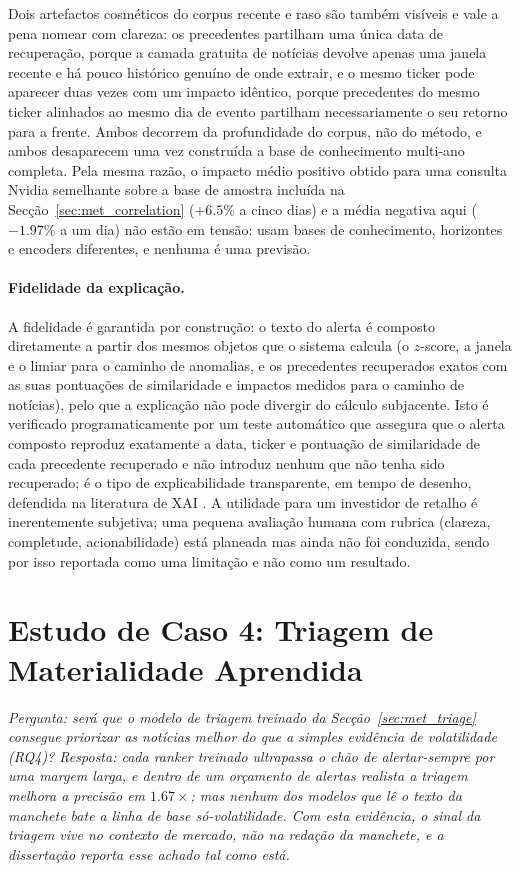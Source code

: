 Dois artefactos cosméticos do corpus recente e raso são também visíveis e vale a pena nomear com clareza: os
precedentes partilham uma única data de recuperação, porque a camada gratuita de notícias devolve apenas uma
janela recente e há pouco histórico genuíno de onde extrair, e o mesmo ticker pode aparecer duas vezes com um
impacto idêntico, porque precedentes do mesmo ticker alinhados ao mesmo dia de evento partilham necessariamente
o seu retorno para a frente. Ambos decorrem da profundidade do corpus, não do método, e ambos desaparecem uma
vez construída a base de conhecimento multi-ano completa. Pela mesma razão, o impacto médio positivo obtido
para uma consulta Nvidia semelhante sobre a base de amostra incluída na Secção~\ref{sec:met_correlation}
($+6.5\%$ a cinco dias) e a média negativa aqui ($-1.97\%$ a um dia) não estão em tensão: usam bases de
conhecimento, horizontes e encoders diferentes, e nenhuma é uma previsão.

\paragraph{Fidelidade da explicação.}
A fidelidade é garantida por construção: o texto do alerta é composto diretamente a partir dos mesmos objetos
que o sistema calcula (o $z$-score, a janela e o limiar para o caminho de anomalias, e os precedentes
recuperados exatos com as suas pontuações de similaridade e impactos medidos para o caminho de notícias), pelo
que a explicação não pode divergir do cálculo subjacente. Isto é verificado programaticamente por um teste
automático que assegura que o alerta composto reproduz exatamente a data, ticker e pontuação de similaridade de
cada precedente recuperado e não introduz nenhum que não tenha sido recuperado; é o tipo de explicabilidade
transparente, em tempo de desenho, defendida na literatura de XAI \autocite{arrieta2020xai}. A utilidade para
um investidor de retalho é inerentemente subjetiva; uma pequena avaliação humana com rubrica (clareza,
completude, acionabilidade) está planeada mas ainda não foi conduzida, sendo por isso reportada como uma
limitação e não como um resultado.

\section{Estudo de Caso 4: Triagem de Materialidade Aprendida}
\label{sec:cs_triage}

\emph{Pergunta: será que o modelo de triagem treinado da Secção~\ref{sec:met_triage} consegue priorizar as
notícias melhor do que a simples evidência de volatilidade (\gls{RQ}4)? Resposta: cada ranker treinado
ultrapassa o chão de alertar-sempre por uma margem larga, e dentro de um orçamento de alertas realista a
triagem melhora a precisão em $1.67\times$; mas nenhum dos modelos que lê o texto da manchete bate a linha de base
só-volatilidade. Com esta evidência, o sinal da triagem vive no contexto de mercado, não na redação da
manchete, e a dissertação reporta esse achado tal como está.}


